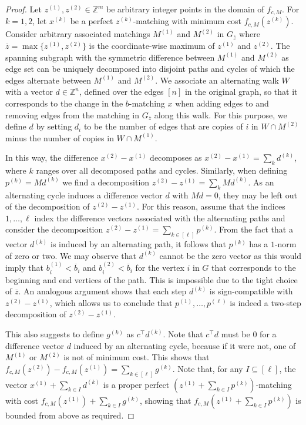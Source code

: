 \documentclass[a4paper,UKenglish,cleveref,thm-restate]{lipics-v2021}
\newcommand{\Z}{\mathbb Z}
\begin{document}
\begin{proof}
    Let $z^{(1)},z^{(2)}\in\Z^m$ be arbitrary integer points in the domain of $f_{c,M}$. For $k=1,2$, let $x^{(k)}$ be a perfect $z^{(k)}$-matching with minimum cost $f_{c,M}(z^{(k)})$. Consider arbitrary associated matchings $M^{(1)}$ and $M^{(2)}$ in $G_{\overline z}$ where $\overline z=\max\{z^{(1)},z^{(2)}\}$ is the coordinate-wise maximum of $z^{(1)}$ and $z^{(2)}$. The spanning subgraph with the symmetric difference between $M^{(1)}$ and $M^{(2)}$ as edge set can be uniquely decomposed into disjoint paths and cycles of which the edges alternate between $M^{(1)}$ and $M^{(2)}$. We associate an alternating walk $W$ with a vector $d\in\Z^n$, defined over the edges $[n]$ in the original graph, so that it corresponds to the change in the $b$-matching $x$ when adding edges to and removing edges from the matching in $G_{\overline z}$ along this walk. For this purpose, we define $d$ by setting $d_i$ to be the number of edges that are copies of $i$ in $W\cap M^{(2)}$ minus the number of copies in $W\cap M^{(1)}$.
    
    In this way, the difference $x^{(2)}-x^{(1)}$ decomposes as $x^{(2)}-x^{(1)}=\sum_kd^{(k)}$, where $k$ ranges over all decomposed paths and cycles. Similarly, when defining $p^{(k)}=Md^{(k)}$ we find a decomposition $z^{(2)}-z^{(1)}=\sum_kMd^{(k)}$. As an alternating cycle induces a difference vector $d$ with $Md=0$, they may be left out of the decomposition of $z^{(2)}-z^{(1)}$. For this reason, assume that the indices $1,\dots,\ell$ index the difference vectors associated with the alternating paths and consider the decomposition $z^{(2)}-z^{(1)}=\sum_{k\in[\ell]}p^{(k)}$. From the fact that a vector $d^{(k)}$ is induced by an alternating path, it follows that $p^{(k)}$ has a $1$-norm of zero or two. We may observe that $d^{(k)}$ cannot be the zero vector as this would imply that $b_i^{(1)}<\overline b_i$ and $b_i^{(2)}<\overline b_i$ for the vertex $i$ in $G$ that corresponds to the beginning and end vertices of the path. This is impossible due to the tight choice of $\overline z$. An analogous argument shows that each step $d^{(k)}$ is sign-compatible with $z^{(2)}-z^{(1)}$, which allows us to conclude that $p^{(1)},\dots,p^{(\ell)}$ is indeed a two-step decomposition of $z^{(2)}-z^{(1)}$.

    This also suggests to define $g^{(k)}$ as $c^\top d^{(k)}$. Note that $c^\top d$ must be $0$ for a difference vector $d$ induced by an alternating cycle, because if it were not, one of $M^{(1)}$ or $M^{(2)}$ is not of minimum cost. This shows that $f_{c,M}(z^{(2)})-f_{c,M}(z^{(1)})=\sum_{k\in[\ell]}g^{(k)}$. Note that, for any $I\subseteq[\ell]$, the vector $x^{(1)}+\sum_{k\in I}d^{(k)}$ is a proper perfect $(z^{(1)}+\sum_{k\in I}p^{(k)})$-matching with cost $f_{c,M}(z^{(1)})+\sum_{k\in I}g^{(k)}$, showing that $f_{c,M}(z^{(1)}+\sum_{k\in I}p^{(k)})$ is bounded from above as required.
\end{proof}
\end{document}
